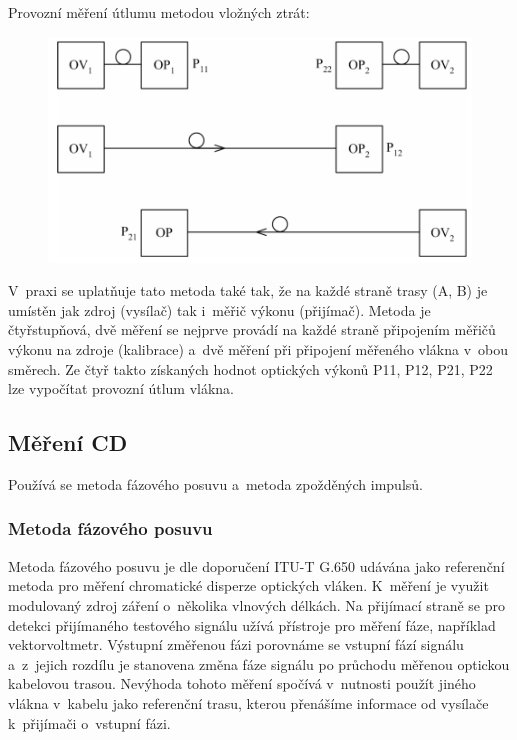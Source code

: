 Provozní měření útlumu metodou vložných ztrát:
\begin{figure}[!ht]
  \begin{center}
    \includegraphics[scale=1]{obrazky/vlozutl.png}
  \end{center}
\end{figure}

V~praxi se uplatňuje tato metoda také tak, že na každé straně trasy (A, B) je umístěn jak zdroj (vysílač) tak i~měřič výkonu (přijímač). Metoda je čtyřstupňová, dvě měření se nejprve provádí na každé straně připojením měřičů výkonu na zdroje (kalibrace) a~dvě měření při připojení měřeného vlákna v~obou směrech. Ze čtyř takto získaných hodnot optických výkonů P11, P12, P21, P22 lze vypočítat provozní útlum vlákna.

\subsection{Měření CD}
Používá se metoda fázového posuvu a~metoda zpožděných impulsů.

\subsubsection{Metoda fázového posuvu}
Metoda fázového posuvu je dle doporučení ITU-T G.650 udávána jako referenční metoda pro měření chromatické disperze optických vláken. K~měření je využit modulovaný zdroj záření o~několika vlnových délkách. Na přijímací straně se pro detekci přijímaného testového signálu užívá přístroje pro měření fáze, například vektorvoltmetr. Výstupní změřenou fázi porovnáme se vstupní fází signálu a~z~jejich rozdílu je stanovena změna fáze signálu po průchodu měřenou optickou kabelovou trasou. Nevýhoda tohoto měření spočívá v~nutnosti použít jiného vlákna v~kabelu jako referenční trasu, kterou přenášíme informace od vysílače k~přijímači o~vstupní fázi.

